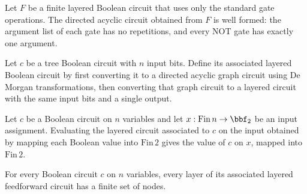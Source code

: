 \begin{theorem}
\label{BoolCircuit.LayeredCircuit.toDAG_isWellFormed}
\leanok
{}
Let $F$ be a finite layered Boolean circuit that uses only the standard gate operations.
The directed acyclic circuit obtained from $F$ is well formed: the argument list of each
gate has no repetitions, and every NOT gate has exactly one argument.
\end{theorem}

\begin{definition}
\label{BoolCircuit.TreeCircuit.toLayered}
\leanok
{}
Let $c$ be a tree Boolean circuit with $n$ input bits. Define its associated layered
Boolean circuit by first converting it to a directed acyclic graph circuit using De
Morgan transformations, then converting that graph circuit to a layered circuit with the
same input bits and a single output.
\end{definition}

\begin{theorem}
\leanok
{}
Let $c$ be a Boolean circuit on $n$ variables and let $x : \mathrm{Fin}\,n \to \bbf_2$
be an input assignment. Evaluating the layered circuit associated to $c$ on the input
obtained by mapping each Boolean value into $\mathrm{Fin}\,2$ gives the value of $c$ on
$x$, mapped into $\mathrm{Fin}\,2$.
\end{theorem}

\begin{theorem}
\label{BoolCircuit.TreeCircuit.toLayered_finite}
\leanok
{}
For every Boolean circuit $c$ on $n$ variables, every layer of its associated layered
feedforward circuit has a finite set of nodes.
\end{theorem}

